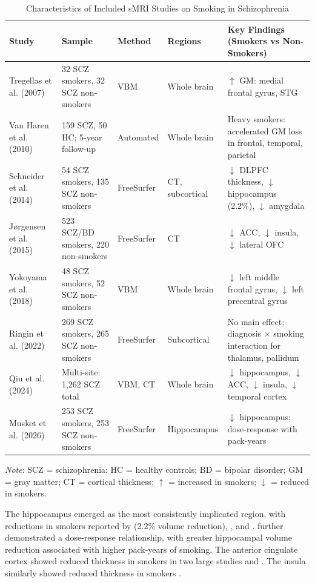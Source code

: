\documentclass[12pt]{article}
\begin{document}
\begin{table}[htbp]
\centering
\caption{Characteristics of Included sMRI Studies on Smoking in Schizophrenia}
\label{tab:smri}
\small
\begin{tabular}{p{2.5cm}p{3.5cm}p{1.8cm}p{2cm}p{4cm}}
\toprule
Study & Sample & Method & Regions & Key Findings (Smokers vs Non-Smokers) \\
\midrule
Tregellas et al. (2007) & 32 SCZ smokers, 32 SCZ non-smokers & VBM & Whole brain & $\uparrow$ GM: medial frontal gyrus, STG \\
Van Haren et al. (2010) & 159 SCZ, 50 HC; 5-year follow-up & Automated & Whole brain & Heavy smokers: accelerated GM loss in frontal, temporal, parietal \\
Schneider et al. (2014) & 54 SCZ smokers, 135 SCZ non-smokers & FreeSurfer & CT, subcortical & $\downarrow$ DLPFC thickness, $\downarrow$ hippocampus (2.2\%), $\downarrow$ amygdala \\
J{\o}rgensen et al. (2015) & 523 SCZ/BD smokers, 220 non-smokers & FreeSurfer & CT & $\downarrow$ ACC, $\downarrow$ insula, $\downarrow$ lateral OFC \\
Yokoyama et al. (2018) & 48 SCZ smokers, 52 SCZ non-smokers & VBM & Whole brain & $\downarrow$ left middle frontal gyrus, $\downarrow$ left precentral gyrus \\
Ringin et al. (2022) & 269 SCZ smokers, 265 SCZ non-smokers & FreeSurfer & Subcortical & No main effect; diagnosis $\times$ smoking interaction for thalamus, pallidum \\
Qiu et al. (2024) & Multi-site: 1,262 SCZ total & VBM, CT & Whole brain & $\downarrow$ hippocampus, $\downarrow$ ACC, $\downarrow$ insula, $\downarrow$ temporal cortex \\
Musket et al. (2026) & 253 SCZ smokers, 253 SCZ non-smokers & FreeSurfer & Hippocampus & $\downarrow$ hippocampus; dose-response with pack-years \\
\bottomrule
\end{tabular}

\vspace{0.5em}
\footnotesize\textit{Note}: SCZ = schizophrenia; HC = healthy controls; BD = bipolar disorder; GM = gray matter; CT = cortical thickness; $\uparrow$ = increased in smokers; $\downarrow$ = reduced in smokers.
\end{table}

The hippocampus emerged as the most consistently implicated region, with reductions in smokers reported by \citet{schneider2014} (2.2\% volume reduction), \citet{qiu2024}, and \citet{musket2026}. \citet{musket2026} further demonstrated a dose-response relationship, with greater hippocampal volume reduction associated with higher pack-years of smoking. The anterior cingulate cortex showed reduced thickness in smokers in two large studies \citep[N = 743]{jorgensen2015} and \citep[N = 1,262]{qiu2024}. The insula similarly showed reduced thickness in smokers \citep{jorgensen2015, qiu2024}.
\end{document}
